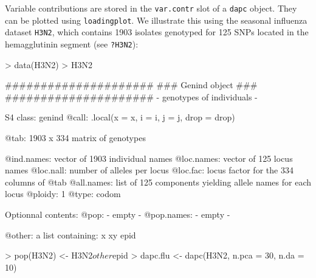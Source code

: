 \documentclass{article}
\begin{document}
Variable contributions are stored in the \texttt{var.contr} slot of a \texttt{dapc} object.
They can be plotted using \texttt{loadingplot}.
We illustrate this using the seasonal influenza dataset \texttt{H3N2}, which contains 1903 isolates
genotyped for 125 SNPs located in the hemagglutinin segment (see \texttt{?H3N2}):
\begin{Schunk}
\begin{Sinput}
> data(H3N2)
> H3N2
\end{Sinput}
\begin{Soutput}
   #####################
   ### Genind object ### 
   #####################
- genotypes of individuals - 

S4 class:  genind
@call: .local(x = x, i = i, j = j, drop = drop)

@tab:  1903 x 334 matrix of genotypes

@ind.names: vector of  1903 individual names
@loc.names: vector of  125 locus names
@loc.nall: number of alleles per locus
@loc.fac: locus factor for the  334 columns of @tab
@all.names: list of  125 components yielding allele names for each locus
@ploidy:  1
@type:  codom

Optionnal contents: 
@pop:  - empty -
@pop.names:  - empty -

@other: a list containing: x  xy  epid 
\end{Soutput}
\begin{Sinput}
> pop(H3N2) <- H3N2$other$epid
> dapc.flu <- dapc(H3N2, n.pca = 30, n.da = 10)
\end{Sinput}
\end{Schunk}
\end{document}
